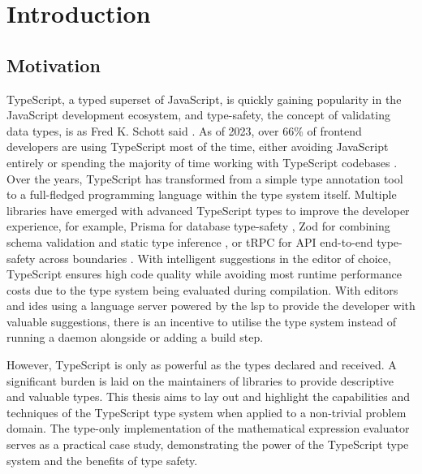 \chapter{Introduction}

\section{Motivation}

TypeScript, a typed superset of JavaScript, is quickly gaining popularity in the JavaScript development ecosystem, and type-safety, the concept of validating data types, is  as Fred K. Schott said \cite{jsworldconferenceFredSchottTypesafety2023}. As of 2023, over 66\% of frontend developers are using TypeScript most of the time, either avoiding JavaScript entirely or spending the majority of time working with TypeScript codebases \cite{StateJS2022}. Over the years, TypeScript has transformed from a simple type annotation tool to a full-fledged programming language within the type system itself. Multiple libraries have emerged with advanced TypeScript types to improve the developer experience, for example, Prisma for database type-safety \cite{PrismaPrismaNextgeneration}, Zod for combining schema validation and static type inference \cite{mcdonnellZod2023}, or tRPC for API end-to-end type-safety across boundaries \cite{TRPC2023}. With intelligent suggestions in the editor of choice, TypeScript ensures high code quality while avoiding most runtime performance costs due to the type system being evaluated during compilation. With editors and \acrshort{ide}s using a language server powered by the \acrfull{lsp} to provide the developer with valuable suggestions, there is an incentive to utilise the type system instead of running a daemon alongside or adding a build step.

However, TypeScript is only as powerful as the types declared and received. A significant burden is laid on the maintainers of libraries to provide descriptive and valuable types. This thesis aims to lay out and highlight the capabilities and techniques of the TypeScript type system when applied to a non-trivial problem domain. The type-only implementation of the mathematical expression evaluator serves as a practical case study, demonstrating the power of the TypeScript type system and the benefits of type safety.


